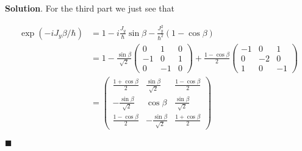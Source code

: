\documentclass[12pt]{article}
\theoremstyle{definition}
\newenvironment{s}{%
        \begin{trivlist} \item \textbf{Solution}. }{%
            \hspace*{\fill} $\blacksquare$\end{trivlist}}%
\begin{document}
{\begin{s}
For the third part we just see that 

\begin{align*}
\exp(-iJ_{y}\beta/\hbar) &= 1 - i\frac{J_{y}}{\hbar}\sin\beta - \frac{J_{y}^{2}}{\hbar^{2}}(1-\cos\beta)\\
&= 1 - \frac{\sin\beta}{\sqrt{2}}\begin{pmatrix}
0&1&0\\
-1&0&1\\
0&-1&0
\end{pmatrix} + \frac{1-\cos\beta}{2}\begin{pmatrix}
-1&0&1\\
0&-2&0\\
1&0&-1
\end{pmatrix}\\
&= \begin{pmatrix}
\frac{1+\cos\beta}{2}&\frac{\sin\beta}{\sqrt{2}}&\frac{1-\cos\beta}{2}\\
-\frac{\sin\beta}{\sqrt{2}}&\cos\beta&\frac{\sin\beta}{\sqrt{2}}\\
\frac{1-\cos\beta}{2}&-\frac{\sin\beta}{\sqrt{2}}&\frac{1+\cos\beta}{2}
\end{pmatrix}
\end{align*}


\end{s}
\end{document}
